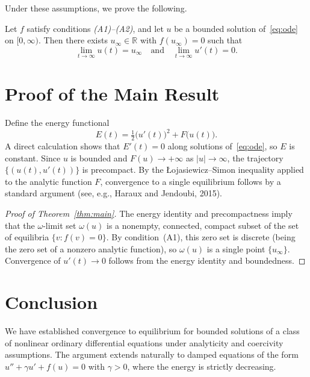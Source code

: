 \documentclass{article}
\begin{document}
Under these assumptions, we prove the following.

\begin{theorem}\label{thm:main}
Let $f$ satisfy conditions \emph{(A1)--(A2)}, and let $u$ be a bounded solution
of~\eqref{eq:ode} on $[0,\infty)$. Then there exists $u_\infty \in \mathbb{R}$ with
$f(u_\infty) = 0$ such that
\[
\lim_{t \to \infty} u(t) = u_\infty \quad \text{and} \quad \lim_{t \to \infty} u'(t) = 0.
\]
\end{theorem}

\section{Proof of the Main Result}

Define the energy functional
\[
E(t) = \tfrac{1}{2}\bigl(u'(t)\bigr)^2 + F\bigl(u(t)\bigr).
\]
A direct calculation shows that $E'(t) = 0$ along solutions of~\eqref{eq:ode},
so $E$ is constant. Since $u$ is bounded and $F(u) \to +\infty$ as $|u| \to \infty$,
the trajectory $\{(u(t), u'(t))\}$ is precompact. By the {\L}ojasiewicz--Simon inequality
applied to the analytic function $F$, convergence to a single equilibrium follows
by a standard argument (see, e.g., Haraux and Jendoubi, 2015).

\begin{proof}[Proof of Theorem~\ref{thm:main}]
The energy identity and precompactness imply that the $\omega$-limit set
$\omega(u)$ is a nonempty, connected, compact subset of the set of equilibria
$\{v : f(v) = 0\}$. By condition~(A1), this zero set is discrete (being the zero set
of a nonzero analytic function), so $\omega(u)$ is a single point $\{u_\infty\}$.
Convergence of $u'(t) \to 0$ follows from the energy identity and boundedness.
\end{proof}

\section{Conclusion}
We have established convergence to equilibrium for bounded solutions of a class of
nonlinear ordinary differential equations under analyticity and coercivity assumptions.
The argument extends naturally to damped equations of the form $u'' + \gamma u' + f(u) = 0$
with $\gamma > 0$, where the energy is strictly decreasing.
\end{document}
